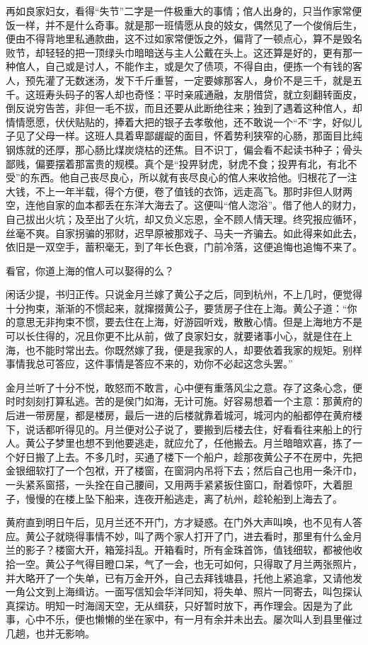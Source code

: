 \documentclass[12pt,UTF8]{ctexbook}
\begin{document}
再如良家妇女，看得“失节”二字是一件极重大的事情；倌人出身的，只当作家常便饭一样，并不是什么奇事。就是那一班情愿从良的妓女，偶然见了一个俊俏后生，便由不得背地里私通款曲，这不过如家常便饭之外，偏背了一顿点心，算不是毁名败节，却轻轻的把一顶绿头巾暗暗送与主人公戴在头上。这还算是好的，更有那一种倌人，自己或是讨人，不能作主，或是欠了债项，不得自由，便拣一个有钱的客人，预先灌了无数迷汤，发下千斤重誓，一定要嫁那客人，身价不是三千，就是五千。这班寿头码子的客人却也奇怪：平时亲戚通融，友朋借贷，就立刻翻转面皮，倒反说穷告苦，非但一毛不拔，而且还要从此断绝往来；独到了遇着这种倌人，却情情愿愿，伏伏贴贴的，捧着大把的银子去孝敬他，还不敢说一个“不”字，好似儿子见了父母一样。这班人具着卑鄙龌龊的面目，怀着势利狭窄的心肠，那面目比纯钢炼就的还厚，那心肠比煤炭烧枯的还焦。目不识丁，偏会看不起读书种子；骨头鄙贱，偏要摆着那富贵的规模。真个是“投畀豺虎，豺虎不食；投畀有北，有北不受”的东西。他自己丧尽良心，所以就有丧尽良心的倌人来收拾他。归根花了一注大钱，不上一年半载，得个方便，卷了值钱的衣饰，远走高飞。那时非但人财两空，连他自家的血本都丢在东洋大海去了。这便叫“倌人淴浴”。借了他人的财力，自己拔出火坑；及至出了火坑，却又负义忘恩，全不顾人情天理。终究报应循环，丝毫不爽。自家拐骗的邪财，迟早原被那戏子、马夫一齐骗去。如此得来如此去，依旧是一双空手，蓄积毫无，到了年长色衰，门前冷落，这便追悔也追悔不来了。

看官，你道上海的倌人可以娶得的么？

闲话少提，书归正传。只说金月兰嫁了黄公子之后，同到杭州，不上几时，便觉得十分拘束，渐渐的不惯起来，就撺掇黄公子，要赁房子住在上海。黄公子道：“你的意思无非拘束不惯，要去住在上海，好游园听戏，散散心情。但是上海地方不是可以长住得的，况且你更不比从前，做了良家妇女，就要诸事小心，就是住在上海，也不能时常出去。你既然嫁了我，便是我家的人，却要依着我家的规矩。别样事情我总可答应，这件事情是答应不来的，劝你不必起这念头罢。”

金月兰听了十分不悦，敢怒而不敢言，心中便有重落风尘之意。存了这条心念，便时时刻刻打算私逃。苦的是侯门如海，无计可施。好容易想着一个主意：那黄府的后进一带房屋，都是楼房，最后一进的后楼就靠着城河，城河内的船都停在黄府楼下，说话都听得见的。月兰便对公子说了，要搬到后楼去住，好看看往来船上的行人。黄公子梦里也想不到他要逃走，就应允了，任他搬去。月兰暗暗欢喜，拣了一个好日搬了上去。不多几时，买通了楼下一个船户，趁那夜黄公子不在房中，先把金银细软打了一个包袱，开了楼窗，在窗洞内吊将下去；然后自己也用一条汗巾，一头紧系窗搭，一头拴在自己腰间，又用两手紧紧扳住窗口，耐着惊吓，大着胆子，慢慢的在楼上坠下船来，连夜开船逃走，离了杭州，趁轮船到上海去了。

黄府直到明日午后，见月兰还不开门，方才疑惑。在门外大声叫唤，也不见有人答应。黄公子就晓得事情不妙，叫了两个家人打开了门，进去看时，那里有什么金月兰的影子？楼窗大开，箱笼抖乱。开箱看时，所有金珠首饰，值钱细软，都被他收拾一空。黄公子气得目瞪口呆，气了一会，也无可如何，只得取了月兰两张照片，并大略开了一个失单，已有万金开外，自己去拜钱塘县，托他上紧追拿，又请他发一角公文到上海缉访。一面写信知会华洋同知，将失单、照片一同寄去，叫包探认真探访。明知一时海阔天空，无从缉获，只好暂时放下，再作理会。因是为了此事，心中不乐，便也懒懒的坐在家中，有一月有余并未出去。屡次叫人到县里催过几趟，也并无影响。
\end{document}
